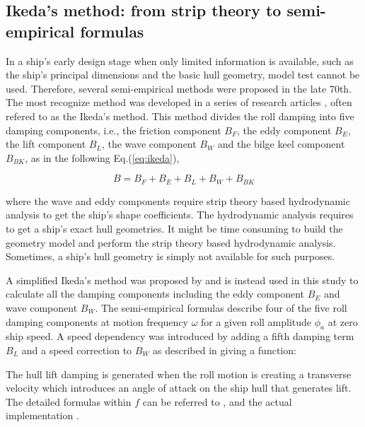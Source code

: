 
\subsection{Ikeda's method: from strip theory to semi-empirical formulas}
\label{se:semi-empirical methods}
In a ship's early design stage when only limited information is available, such as the ship's principal dimensions and the basic hull geometry, model test cannot be used. Therefore, several semi-empirical methods were proposed in the late 70th. The most recognize method was developed in a series of research articles \parencite{ikeda_roll_1978,ikeda_eddy_1978,ikeda_roll_1979,ikeda_components_1978,ikeda_velocity_1979}, often refered to as the Ikeda's method. This method divides the roll damping into five damping components, i.e., the friction component $B_F$, the eddy component $B_E$, the lift component $B_L$, the wave component $B_W$ and the bilge keel component $B_{BK}$, as in the following Eq.(\ref{eq:ikeda}), 

\begin{equation} \label{eq:ikeda}
B = B_F + B_E + B_L + B_W + B_{BK}
\end{equation}

where the wave and eddy components require strip theory based hydrodynamic analysis to get the ship's shape coefficients. The hydrodynamic analysis requires to get a ship's exact hull geometries. It might be time consuming to build the geometry model and perform the strip theory based hydrodynamic analysis. Sometimes, a ship's hull geometry is simply not available for such purposes. 

A simplified Ikeda's method was proposed by \parencite{kawahara_simple_2011} and is instead used in this study to calculate all the damping components including the eddy component $B_E$ and wave component $B_W$. The semi-empirical formulas describe four of the five roll damping components at motion frequency $\omega$ for a given roll amplitude $\phi_a$ at zero ship speed. A speed dependency was introduced by adding a fifth damping term $B_L$ and a speed correction to $B_W$ as described in \parencite{ikeda_velocity_1979} giving a function: 



The hull lift damping is generated when the roll motion is creating a transverse velocity which introduces an angle of attack on the ship hull that generates lift.     
The detailed formulas within $f$ can be referred to \parencite{kawahara_simple_2011}, \parencite{ikeda_velocity_1979} and the actual implementation \parencite{alexandersson_martinlarsalbertrolldecay-estimators_2020}.


